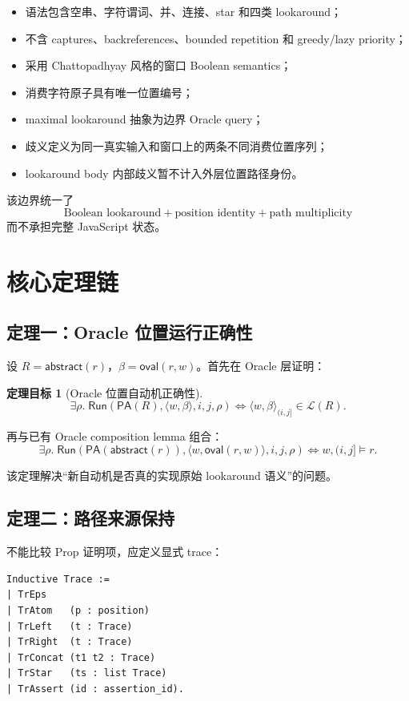 \documentclass[UTF8,a4paper,12pt]{ctexart}
\newtheorem{theorem}[definition]{定理目标}
\newcommand{\PA}{\mathsf{PA}}
\newcommand{\Run}{\mathsf{Run}}
\newcommand{\ovalfn}{\mathsf{oval}}
\newcommand{\abstractfn}{\mathsf{abstract}}
\begin{document}
\begin{itemize}
  \item 语法包含空串、字符谓词、并、连接、star 和四类 lookaround；
  \item 不含 captures、backreferences、bounded repetition 和 greedy/lazy priority；
  \item 采用 Chattopadhyay 风格的窗口 Boolean semantics；
  \item 消费字符原子具有唯一位置编号；
  \item maximal lookaround 抽象为边界 Oracle query；
  \item 歧义定义为同一真实输入和窗口上的两条不同消费位置序列；
  \item lookaround body 内部歧义暂不计入外层位置路径身份。
\end{itemize}

该边界统一了
\[
\boxed{
\text{Boolean lookaround}
+
\text{position identity}
+
\text{path multiplicity}
}
\]
而不承担完整 JavaScript 状态。

\section{核心定理链}

\subsection{定理一：Oracle 位置运行正确性}

设 $R=\abstractfn(r)$，$\beta=\ovalfn(r,w)$。首先在 Oracle 层证明：
\begin{theorem}[Oracle 位置自动机正确性]
\[
\exists \rho.\;
\Run(\PA(R),\langle w,\beta\rangle,i,j,\rho)
\iff
\langle w,\beta\rangle_{(i,j]}\in\mathcal L(R).
\]
\end{theorem}

再与已有 Oracle composition lemma 组合：
\[
\exists \rho.\;
\Run(\PA(\abstractfn(r)),
     \langle w,\ovalfn(r,w)\rangle,i,j,\rho)
\iff
w,(i,j]\models r.
\]

该定理解决“新自动机是否真的实现原始 lookaround 语义”的问题。

\subsection{定理二：路径来源保持}

不能比较 Prop 证明项，应定义显式 trace：

\begin{lstlisting}[caption={建议的显式匹配证书}]
Inductive Trace :=
| TrEps
| TrAtom   (p : position)
| TrLeft   (t : Trace)
| TrRight  (t : Trace)
| TrConcat (t1 t2 : Trace)
| TrStar   (ts : list Trace)
| TrAssert (id : assertion_id).
\end{lstlisting}
\end{document}
